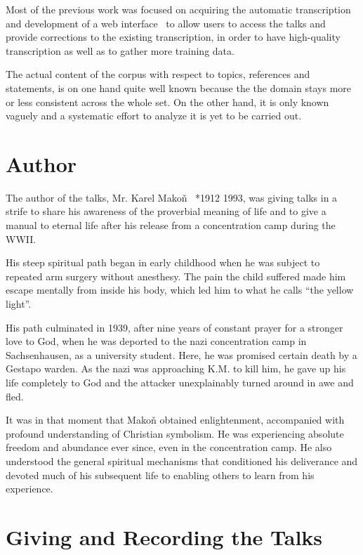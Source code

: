 \documentclass[a4paper,11pt]{article}
\begin{document}
Most of the previous work was focused on acquiring the automatic transcription
and development of a web interface~\cite{kruuza2012making} to allow users to
access the talks and provide corrections to the existing transcription, in order
to have high-quality transcription as well as to gather more training data.

The actual content of the corpus with respect to topics, references and
statements, is on one hand quite well known
because the the domain stays
more or less consistent across the whole set. On the other hand, it is only
known vaguely and a systematic effort to analyze it is yet to be carried out.

\section{Author}

The author of the talks, Mr. Karel Mako\v{n}~\cite{hajek2007cesky} *1912
\textdagger{}1993, was giving talks in a strife to share his awareness of the
proverbial meaning of life and to give a manual to eternal life after his
release from a concentration camp during the WWII.

His steep spiritual path began in early childhood when he was subject to
repeated arm surgery without anesthesy. The pain the child suffered made him
escape mentally from inside his body, which led him to what he calls ``the
yellow light''. 

His path culminated in 1939, after nine years of constant prayer for a
stronger love to God, when he was deported to the nazi concentration camp in
Sachsenhausen, as a university student. Here, he was promised certain death by a
Gestapo warden. As the nazi was approaching K.M. to kill him, he gave up his
life completely to God and the attacker unexplainably turned around in awe and
fled.

It was in that moment that Mako\v{n} obtained enlightenment, accompanied with
profound understanding of Christian symbolism. He was experiencing absolute
freedom and abundance ever since, even in the concentration camp. He also
understood the general spiritual mechanisms that conditioned his deliverance and
devoted much of his subsequent life to enabling others to learn from his
experience.

\section{Giving and Recording the Talks}
\end{document}
